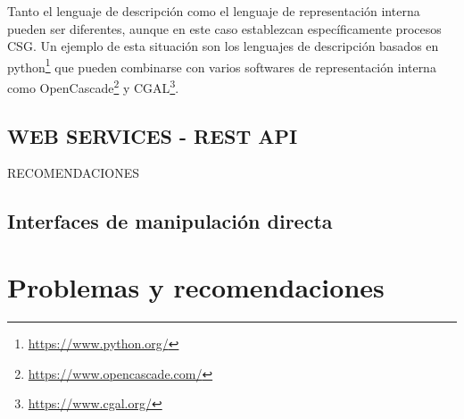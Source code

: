 Tanto el lenguaje de descripción como el lenguaje de representación interna pueden ser diferentes, aunque en este caso establezcan específicamente procesos CSG. Un ejemplo de esta situación son los lenguajes de descripción basados en python\footnote{\url{https://www.python.org/}} que pueden combinarse con varios softwares de representación interna como OpenCascade\footnote{\url{https://www.opencascade.com/}} y CGAL\footnote{\url{https://www.cgal.org/}}.

\clearpage


\clearpage






\subsection{WEB SERVICES - REST API}
RECOMENDACIONES

\subsection{Interfaces de manipulación directa}




\section{Problemas y recomendaciones
}